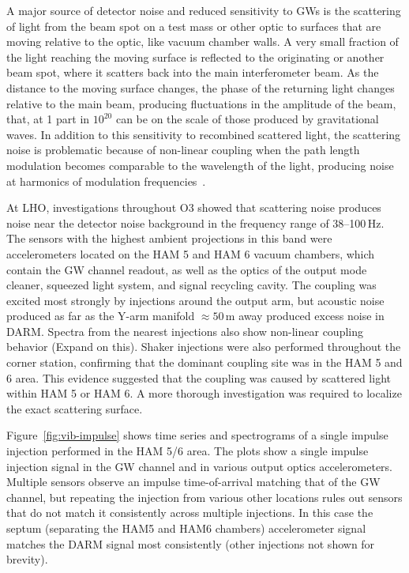 A major source of detector noise and reduced sensitivity to \acp{GW} is the scattering of light from the beam spot on a test mass or other optic to surfaces that are moving relative to the optic, like vacuum chamber walls.
A very small fraction of the light reaching the moving surface is reflected to the originating or another beam spot, where it scatters back into the main interferometer beam.
As the distance to the moving surface changes, the phase of the returning light changes relative to the main beam, producing fluctuations in the amplitude of the beam, that, at 1 part in $10^{20}$ can be on the scale of those produced by gravitational waves.
In addition to this sensitivity to recombined scattered light, the scattering noise is problematic because of non-linear coupling when the path length modulation becomes comparable to the wavelength of the light, producing noise at harmonics of modulation frequencies~\citep{Soni_2020}.

At \ac{LHO}, investigations throughout \ac{O3} showed that scattering noise produces noise near the detector noise background in the frequency range of 38--100\,Hz.
The sensors with the highest ambient projections in this band were accelerometers located on the HAM 5 and HAM 6 vacuum chambers, which contain the \ac{GW} channel readout, as well as the optics of the output mode cleaner, squeezed light system, and signal recycling cavity.
The coupling was excited most strongly by injections around the output arm, but acoustic noise produced as far as the Y-arm manifold $\approx 50$\,m away produced excess noise in \ac{DARM}.
Spectra from the nearest injections also show non-linear coupling behavior ({\color{red}Expand on this}).
Shaker injections were also performed throughout the corner station, confirming that the dominant coupling site was in the HAM 5 and 6 area.
This evidence suggested that the coupling was caused by scattered light within HAM 5 or HAM 6.
A more thorough investigation was required to localize the exact scattering surface.

Figure~\ref{fig:vib-impulse} shows time series and spectrograms of a single impulse injection performed in the \ac{HAM} 5/6 area.
The plots show a single impulse injection signal in the \ac{GW} channel and in various output optics accelerometers.
Multiple sensors observe an impulse time-of-arrival matching that of the \ac{GW} channel, but repeating the injection from various other locations rules out sensors that do not match it consistently across multiple injections.
In this case the septum (separating the HAM5 and HAM6 chambers) accelerometer signal matches the \ac{DARM} signal most consistently (other injections not shown for brevity).

